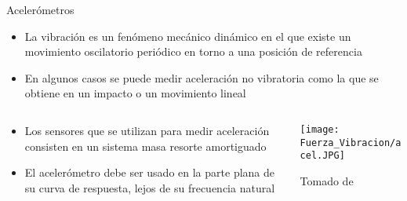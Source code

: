 \documentclass[aspectratio=169]{beamer}
\begin{document}
\begin{frame}{Acelerómetros}
    \begin{itemize}
        \item La vibración es un fenómeno mecánico dinámico en el que existe un movimiento oscilatorio periódico en torno a una posición de referencia 
        \item En algunos casos se puede medir aceleración no vibratoria como la que se obtiene en un impacto o un movimiento lineal
    \end{itemize}
    \begin{columns}[onlytextwidth]
        \begin{column}{0.55\textwidth}
            \begin{itemize}
                \item Los sensores que se utilizan para medir aceleración consisten en un sistema masa resorte amortiguado
                \item El acelerómetro debe ser usado en la parte plana de su curva de respuesta, lejos de su frecuencia natural
            \end{itemize}
        \end{column}
        \begin{column}{0.45\textwidth}
            \centering
            \texttt{[image: Fuerza\_Vibracion/acel.JPG]}

            \tiny{Tomado de \cite{Fraden_2016}}
        \end{column}
    \end{columns}
\end{frame}
\end{document}
